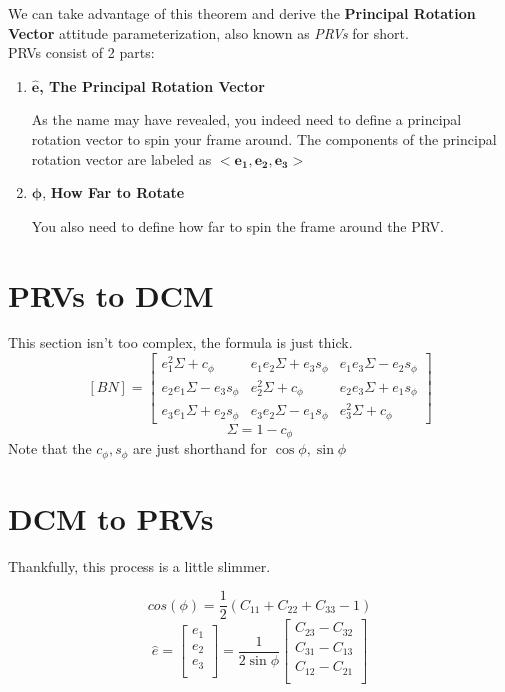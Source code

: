 \documentclass[a4paper,14pt]{extreport}
\begin{document}
We can take advantage of this theorem and derive the \textbf{Principal Rotation Vector} attitude parameterization, also known as \emph{PRVs} for short.\\

PRVs consist of 2 parts:
\begin{enumerate}
\item{\textbf{$\mathbf{\hat{e}}$, The Principal Rotation Vector}

As the name may have revealed, you indeed need to define a principal rotation vector to spin your frame around. The components of the principal rotation vector are labeled as $\mathbf{<e_1, e_2, e_3>}$ }

\item{$\mathbf{\phi}$, \textbf{How Far to Rotate}

You also need to define how far to spin the frame around the PRV.}
\end{enumerate}

\section{PRVs to DCM}
This section isn't too complex, the formula is just thick.
\[[BN] = \begin{bmatrix}
			e_1^2\Sigma+c_\phi&e_1 e_2 \Sigma + e_3 s_\phi&e_1 e_3 \Sigma - e_2 s_\phi\\
			e_2 e_1 \Sigma - e_3 s_\phi&e_2^2 \Sigma + c_\phi&e_2 e_3 \Sigma + e_1 s_\phi\\
			e_3 e_1 \Sigma + e_2 s_\phi&e_3 e_2 \Sigma - e_1 s_\phi&e_3^2 \Sigma + c_\phi
	\end{bmatrix}\]	
\[
\Sigma = 1-c_\phi
\]
Note that the $c_\phi,s_\phi$ are just shorthand for $\cos{\phi},\sin{\phi}$
\section{DCM to PRVs}
Thankfully, this process is a little slimmer.

\[
cos(\phi) = \dfrac{1}{2}(C_{11}+C_{22}+C_{33}-1)
\]
\[
\hat{e} = \begin{bmatrix}
e_1\\e_2\\e_3\\
\end{bmatrix} = \dfrac{1}{2\sin{\phi}}
\begin{bmatrix}
C_{23}-C_{32}\\C_{31}-C_{13}\\C_{12}-C_{21}\\
\end{bmatrix}
\]
\end{document}

